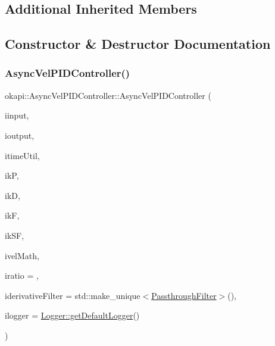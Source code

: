 \subsection*{Additional Inherited Members}


\subsection{Constructor \& Destructor Documentation}
\mbox{\label{classokapi_1_1AsyncVelPIDController_af1f3d7f4b31514ca97500265f5e3295e}} 
\subsubsection{\texorpdfstring{AsyncVelPIDController()}{AsyncVelPIDController()}}
{\footnotesize\ttfamily okapi\+::\+Async\+Vel\+P\+I\+D\+Controller\+::\+Async\+Vel\+P\+I\+D\+Controller (\begin{DoxyParamCaption}\item[{const std\+::shared\+\_\+ptr$<$ \mbox{\hyperlink{classokapi_1_1ControllerInput}{Controller\+Input}}$<$ double $>$$>$ \&}]{iinput,  }\item[{const std\+::shared\+\_\+ptr$<$ \mbox{\hyperlink{classokapi_1_1ControllerOutput}{Controller\+Output}}$<$ double $>$$>$ \&}]{ioutput,  }\item[{const \mbox{\hyperlink{classokapi_1_1TimeUtil}{Time\+Util}} \&}]{itime\+Util,  }\item[{double}]{ikP,  }\item[{double}]{ikD,  }\item[{double}]{ikF,  }\item[{double}]{ik\+SF,  }\item[{std\+::unique\+\_\+ptr$<$ \mbox{\hyperlink{classokapi_1_1VelMath}{Vel\+Math}} $>$}]{ivel\+Math,  }\item[{double}]{iratio = {},  }\item[{std\+::unique\+\_\+ptr$<$ \mbox{\hyperlink{classokapi_1_1Filter}{Filter}} $>$}]{iderivative\+Filter = {\ttfamily std\+:\+:make\+\_\+unique$<$\mbox{\hyperlink{classokapi_1_1PassthroughFilter}{Passthrough\+Filter}}$>$()},  }\item[{const std\+::shared\+\_\+ptr$<$ \mbox{\hyperlink{classokapi_1_1Logger}{Logger}} $>$ \&}]{ilogger = {\ttfamily \mbox{\hyperlink{classokapi_1_1Logger_a5053cf778b4b55acba788a3797dc96d2}{Logger\+::get\+Default\+Logger}}()} }\end{DoxyParamCaption})}

